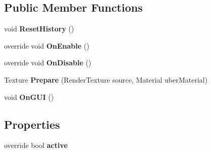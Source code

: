 \subsection*{Public Member Functions}
\begin{DoxyCompactItemize}
\item 
\mbox{\label{class_unity_engine_1_1_post_processing_1_1_eye_adaptation_component_a461fa3fb6ad4571e4d860ed8c7c0beb4}} 
void {\bfseries Reset\+History} ()
\item 
\mbox{\label{class_unity_engine_1_1_post_processing_1_1_eye_adaptation_component_a1fd3a905eb93bbb912e2316baa1b1396}} 
override void {\bfseries On\+Enable} ()
\item 
\mbox{\label{class_unity_engine_1_1_post_processing_1_1_eye_adaptation_component_a983236f00adbfa6c477423ecf2d55eec}} 
override void {\bfseries On\+Disable} ()
\item 
\mbox{\label{class_unity_engine_1_1_post_processing_1_1_eye_adaptation_component_af6319d4a0410aedaa227fe1725e70309}} 
Texture {\bfseries Prepare} (Render\+Texture source, Material uber\+Material)
\item 
\mbox{\label{class_unity_engine_1_1_post_processing_1_1_eye_adaptation_component_a3f25f90f406ea8d9ae4e51194c802a71}} 
void {\bfseries On\+G\+UI} ()
\end{DoxyCompactItemize}
\subsection*{Properties}
\begin{DoxyCompactItemize}
\item 
\mbox{\label{class_unity_engine_1_1_post_processing_1_1_eye_adaptation_component_ae4f7d376419dd90448617b828a9b1238}} 
override bool {\bfseries active}
\end{DoxyCompactItemize}
